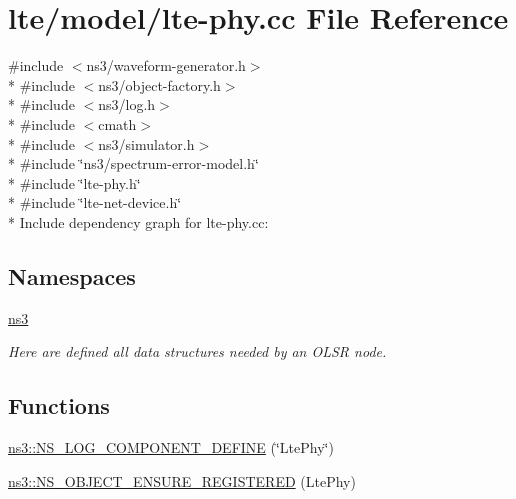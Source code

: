 \hypertarget{lte-phy_8cc}{}\section{lte/model/lte-\/phy.cc File Reference}
\label{lte-phy_8cc}
{\ttfamily \#include $<$ns3/waveform-\/generator.\+h$>$}\\*
{\ttfamily \#include $<$ns3/object-\/factory.\+h$>$}\\*
{\ttfamily \#include $<$ns3/log.\+h$>$}\\*
{\ttfamily \#include $<$cmath$>$}\\*
{\ttfamily \#include $<$ns3/simulator.\+h$>$}\\*
{\ttfamily \#include \char`\"{}ns3/spectrum-\/error-\/model.\+h\char`\"{}}\\*
{\ttfamily \#include \char`\"{}lte-\/phy.\+h\char`\"{}}\\*
{\ttfamily \#include \char`\"{}lte-\/net-\/device.\+h\char`\"{}}\\*
Include dependency graph for lte-\/phy.cc\+:
\subsection*{Namespaces}
\begin{DoxyCompactItemize}
\item 
 \hyperlink{namespacens3}{ns3}
\begin{DoxyCompactList}\small\item\em Here are defined all data structures needed by an O\+L\+SR node. \end{DoxyCompactList}\end{DoxyCompactItemize}
\subsection*{Functions}
\begin{DoxyCompactItemize}
\item 
\hyperlink{namespacens3_a79fedf1ff242200051bd49c2b531f71f}{ns3\+::\+N\+S\+\_\+\+L\+O\+G\+\_\+\+C\+O\+M\+P\+O\+N\+E\+N\+T\+\_\+\+D\+E\+F\+I\+NE} (\char`\"{}Lte\+Phy\char`\"{})
\item 
\hyperlink{namespacens3_a8da088ead638057c55ce76fd5cfaf0d5}{ns3\+::\+N\+S\+\_\+\+O\+B\+J\+E\+C\+T\+\_\+\+E\+N\+S\+U\+R\+E\+\_\+\+R\+E\+G\+I\+S\+T\+E\+R\+ED} (Lte\+Phy)
\end{DoxyCompactItemize}
